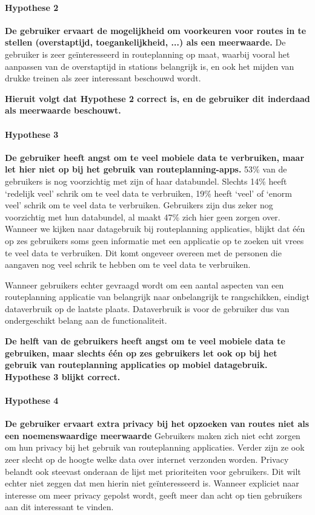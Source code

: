 \paragraph{Hypothese 2}\textbf{De gebruiker ervaart de mogelijkheid om voorkeuren voor routes in te stellen (overstaptijd, toegankelijkheid, ...) als een meerwaarde.}
	De gebruiker is zeer geïnteresseerd in routeplanning op maat, waarbij vooral het aanpassen van de overstaptijd in stations belangrijk is, en ook het mijden van drukke treinen als zeer interessant beschouwd wordt.

\textbf{Hieruit volgt dat Hypothese 2 correct is, en de gebruiker dit inderdaad als meerwaarde beschouwt. }	

\paragraph{Hypothese 3}\textbf{ De gebruiker heeft angst om te veel mobiele data te verbruiken, maar let hier niet op bij het gebruik van routeplanning-apps.}
    53\% van de gebruikers is nog voorzichtig met zijn of haar databundel. Slechts 14\% heeft `redelijk veel' schrik om te veel data te verbruiken, 19\% heeft `veel' of `enorm veel' schrik om te veel data te verbruiken. Gebruikers zijn dus zeker nog voorzichtig met hun databundel, al maakt 47\% zich hier geen zorgen over.
    Wanneer we kijken naar datagebruik bij routeplanning applicaties, blijkt dat één op zes gebruikers soms geen informatie met een applicatie op te zoeken uit vrees te veel data te verbruiken. Dit komt ongeveer overeen met de personen die aangaven nog veel schrik te hebben om te veel data te verbruiken.
    
    Wanneer gebruikers echter gevraagd wordt om een aantal aspecten van een routeplanning applicatie van belangrijk naar onbelangrijk te rangschikken, eindigt dataverbruik op de laatste plaats. Dataverbruik is voor de gebruiker dus van ondergeschikt belang aan de functionaliteit.
    
\textbf{De helft van de gebruikers heeft angst om te veel mobiele data te gebruiken, maar slechts één op zes gebruikers let ook op bij het gebruik van routeplanning applicaties op mobiel datagebruik. Hypothese 3 blijkt correct.}

\paragraph{Hypothese 4}\textbf{De gebruiker ervaart extra privacy bij het opzoeken van routes niet als een noemenswaardige meerwaarde}
	Gebruikers maken zich niet echt zorgen om hun privacy bij het gebruik van routeplanning applicaties. Verder zijn ze ook zeer slecht op de hoogte welke data over internet verzonden worden. Privacy belandt ook steevast onderaan de lijst met prioriteiten voor gebruikers. Dit wilt echter niet zeggen dat men hierin niet geïnteresseerd is. Wanneer expliciet naar interesse om meer privacy gepolst wordt, geeft meer dan acht op tien gebruikers aan dit interessant te vinden.
	
